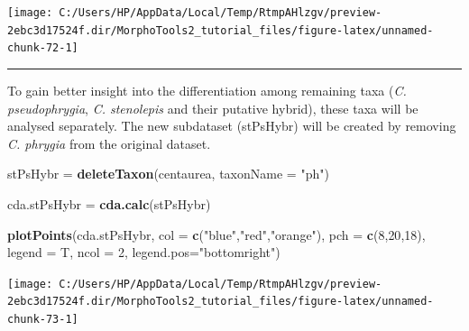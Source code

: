 \documentclass[
]{article}
\newenvironment{Shaded}{\begin{snugshade}}{\end{snugshade}}
\newcommand{\DataTypeTok}[1]{\textcolor[rgb]{0.13,0.29,0.53}{#1}}
\newcommand{\DecValTok}[1]{\textcolor[rgb]{0.00,0.00,0.81}{#1}}
\newcommand{\KeywordTok}[1]{\textcolor[rgb]{0.13,0.29,0.53}{\textbf{#1}}}
\newcommand{\NormalTok}[1]{#1}
\newcommand{\StringTok}[1]{\textcolor[rgb]{0.31,0.60,0.02}{#1}}
\begin{document}
\begin{center}\texttt{[image: C:/Users/HP/AppData/Local/Temp/RtmpAHlzgv/preview-2ebc3d17524f.dir/MorphoTools2\_tutorial\_files/figure-latex/unnamed-chunk-72-1]} \end{center}

\begin{center}\rule{0.5\linewidth}{\linethickness}\end{center}

To gain better insight into the differentiation among remaining taxa
(\emph{C. pseudophrygia}, \emph{C. stenolepis} and their putative
hybrid), these taxa will be analysed separately. The new subdataset
(stPsHybr) will be created by removing \emph{C. phrygia} from the
original dataset.

\begin{Shaded}
\begin{Highlighting}[]
\NormalTok{stPsHybr =}\StringTok{ }\KeywordTok{deleteTaxon}\NormalTok{(centaurea, }\DataTypeTok{taxonName =} \StringTok{"ph"}\NormalTok{)}

\NormalTok{cda.stPsHybr =}\StringTok{ }\KeywordTok{cda.calc}\NormalTok{(stPsHybr)}

\KeywordTok{plotPoints}\NormalTok{(cda.stPsHybr, }\DataTypeTok{col =} \KeywordTok{c}\NormalTok{(}\StringTok{"blue"}\NormalTok{,}\StringTok{"red"}\NormalTok{,}\StringTok{"orange"}\NormalTok{), }\DataTypeTok{pch =} \KeywordTok{c}\NormalTok{(}\DecValTok{8}\NormalTok{,}\DecValTok{20}\NormalTok{,}\DecValTok{18}\NormalTok{), }
            \DataTypeTok{legend =}\NormalTok{ T, }\DataTypeTok{ncol =} \DecValTok{2}\NormalTok{, }\DataTypeTok{legend.pos=}\StringTok{"bottomright"}\NormalTok{)}
\end{Highlighting}
\end{Shaded}

\begin{center}\texttt{[image: C:/Users/HP/AppData/Local/Temp/RtmpAHlzgv/preview-2ebc3d17524f.dir/MorphoTools2\_tutorial\_files/figure-latex/unnamed-chunk-73-1]} \end{center}
\end{document}
